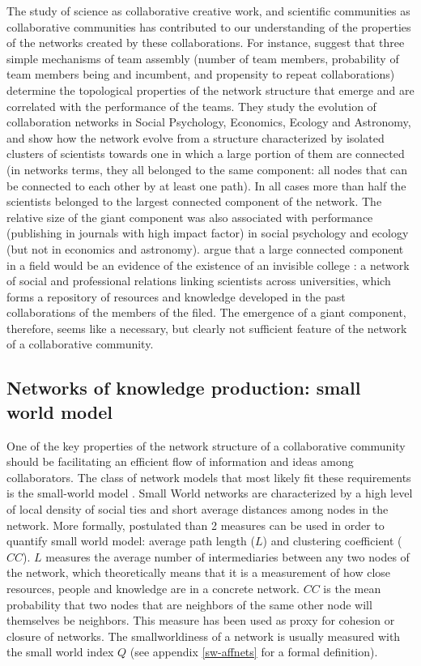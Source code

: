 The study of science as collaborative creative work, and scientific communities as collaborative communities has contributed to our understanding of the properties of the networks created by these collaborations. For instance, \citet{guimera:2005} suggest that three simple mechanisms of team assembly (number of team members, probability of  team members being and incumbent, and propensity to repeat collaborations) determine the topological properties of the network structure that emerge and are correlated with the performance of the teams. They study the evolution of collaboration networks in Social Psychology, Economics, Ecology and Astronomy, and show how the network evolve from a structure characterized by isolated clusters of scientists towards one in which a large portion of them are connected (in networks terms, they all belonged to the same component: all nodes that can be connected to each other by at least one path). In all cases more than half the scientists belonged to the largest connected component of the network. The relative size of the giant component was also associated with performance (publishing in journals with high impact factor) in social psychology and ecology (but not in economics and astronomy). \citet{guimera:2005}  argue that a large connected component in a field would be an evidence of the existence of an invisible college \citep{solla:1986,merton:1979}: a network of social and professional relations linking scientists across universities, which forms a repository of resources and knowledge developed in the past collaborations of the members of the filed.  The emergence of a giant component, therefore, seems like a necessary, but clearly not sufficient feature of the network of a collaborative community.

\subsection{Networks of knowledge production: small world model}

One of the key properties of the network structure of a collaborative community should be facilitating an efficient flow of information and ideas among collaborators. The class of network models that most likely fit these requirements is the small-world model \citep{watts:1998}. Small World networks are characterized by a high level of local density of social ties and short average distances among nodes in the network. More formally,\citet{watts:1998} postulated than 2 measures can be used in order to quantify small world model: average path length ($L$) and clustering coefficient ($CC$). $L$ measures the average number of intermediaries between any two nodes of the network, which theoretically means that it is a measurement of how close resources, people and knowledge are in a concrete network. $CC$ is the mean probability that two nodes that are neighbors of the same other node will themselves be neighbors. This measure has been used as proxy for cohesion or closure of networks. The smallworldiness of a network is usually measured with the small world index $Q$ (see appendix \ref{sw-affnets} for a formal definition).

